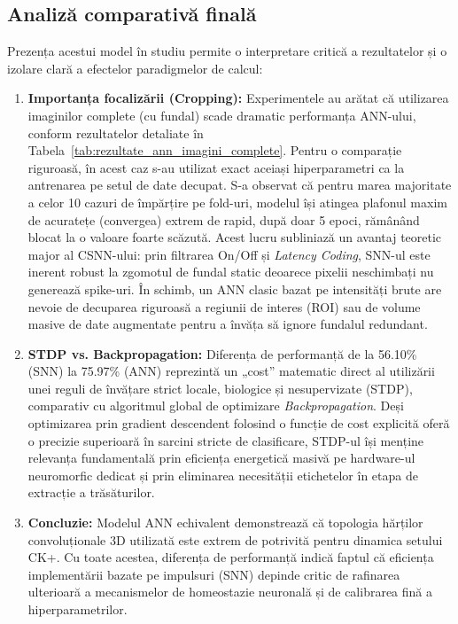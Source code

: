 \subsection*{Analiză comparativă finală}

Prezența acestui model în studiu permite o interpretare critică a rezultatelor și o izolare clară a efectelor paradigmelor de calcul:

\begin{enumerate}
	\item \textbf{Importanța focalizării (Cropping):} Experimentele au arătat că utilizarea imaginilor complete (cu fundal) scade dramatic performanța ANN-ului, conform rezultatelor detaliate în Tabela~\ref{tab:rezultate_ann_imagini_complete}. Pentru o comparație riguroasă, în acest caz s-au utilizat exact aceiași hiperparametri ca la antrenarea pe setul de date decupat. S-a observat că pentru marea majoritate a celor 10 cazuri de împărțire pe fold-uri, modelul își atingea plafonul maxim de acuratețe (convergea) extrem de rapid, după doar 5 epoci, rămânând blocat la o valoare foarte scăzută. Acest lucru subliniază un avantaj teoretic major al CSNN-ului: prin filtrarea On/Off și \textit{Latency Coding}, SNN-ul este inerent robust la zgomotul de fundal static deoarece pixelii neschimbați nu generează spike-uri. În schimb, un ANN clasic bazat pe intensități brute are nevoie de decuparea riguroasă a regiunii de interes (ROI) sau de volume masive de date augmentate pentru a învăța să ignore fundalul redundant.
	\item \textbf{STDP vs. Backpropagation:} Diferența de performanță de la 56.10\% (SNN) la 75.97\% (ANN) reprezintă un „cost” matematic direct al utilizării unei reguli de învățare strict locale, biologice și nesupervizate (STDP), comparativ cu algoritmul global de optimizare \textit{Backpropagation}. Deși optimizarea prin gradient descendent folosind o funcție de cost explicită oferă o precizie superioară în sarcini stricte de clasificare, STDP-ul își menține relevanța fundamentală prin eficiența energetică masivă pe hardware-ul neuromorfic dedicat și prin eliminarea necesității etichetelor în etapa de extracție a trăsăturilor.
	\item \textbf{Concluzie:} Modelul ANN echivalent demonstrează că topologia hărților con\-vo\-lu\-țio\-na\-le 3D utilizată este extrem de potrivită pentru dinamica setului CK+. Cu toate acestea, diferența de performanță indică faptul că eficiența implementării bazate pe impulsuri (SNN) depinde critic de rafinarea ulterioară a mecanismelor de homeostazie neuronală și de calibrarea fină a hiperparametrilor.
\end{enumerate}
